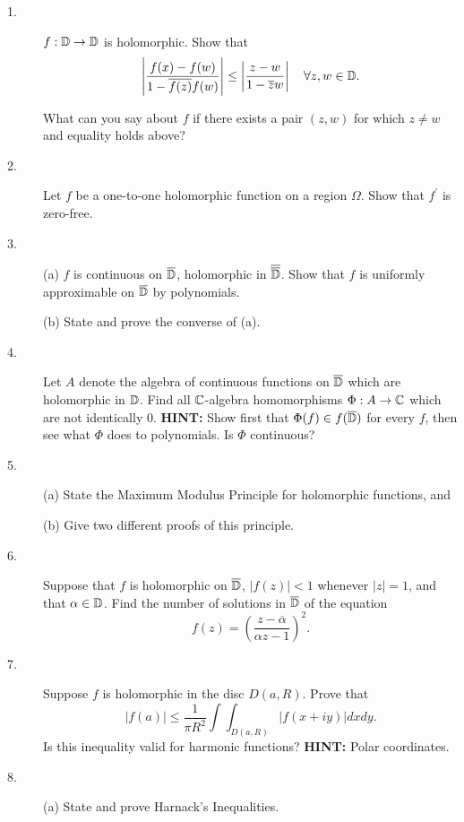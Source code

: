 \documentclass{article}
\begin{document}
\begin{description}
\item[1.]
$f:\Bbb D \to \Bbb D$ is holomorphic. Show that
$$\left| \frac{f(x) - f(w)}{1- \overline{f(z)} f(w)} \right| \leq
  \left| \frac{z-w}{1-\overline z w} \right| \quad
  \forall z, w \in \Bbb D.$$

What can you say about $f$ if there exists a pair $(z,w)$ for which
$z \neq w$ and equality holds above?

\item[2.]
Let $f$ be a one-to-one holomorphic function on a region $\Omega$. Show
that $f^\prime$ is zero-free.

\item[3.] (a)
$f$ is continuous on $\overline{\Bbb D}$, holomorphic in
$\overline{\overline{\Bbb D}}$.
Show that $f$ is uniformly approximable on $\overline{\Bbb D}$ by
polynomials.

\item[\quad] (b)
State and prove the converse of (a).

\item[4.]
Let $A$ denote the algebra of continuous functions on $\overline{\Bbb D}$
which are holomorphic in $\Bbb D$. Find all $\Bbb C$-algebra homomorphisms
$\Phi : A \to \Bbb C$ which are not identically 0. {\bf HINT:} Show first
that $\Phi (f) \in f(\overline{\Bbb D})$ for every $f$, then see what
$\Phi$ does to polynomials. Is $\Phi$ continuous?

\item[5.] (a)
State the Maximum Modulus Principle for holomorphic functions, and

\item[\quad] (b)
Give two different proofs of this principle.

\item[6.]
Suppose that $f$ is holomorphic on $\overline{\Bbb D}$, $|f(z)| < 1$
whenever $|z| = 1$, and that $\alpha \in \Bbb D$. Find the number of
solutions in $\overline{\Bbb D}$ of the equation
$$f(z) = \left( \frac{z-\overline \alpha}{\alpha z -1} \right)^2.$$

\item[7.]
Suppose $f$ is holomorphic in the disc $D (a, R)$. Prove that
$$|f(a)| \leq \frac{1}{\pi R^2} \int \int_{D(a,R)} |f(x + iy) | dxdy.$$
Is this inequality valid for harmonic functions? {\bf HINT:} Polar
coordinates.

\item[8.](a)
State and prove Harnack's Inequalities.


\end{description}
\end{document}
